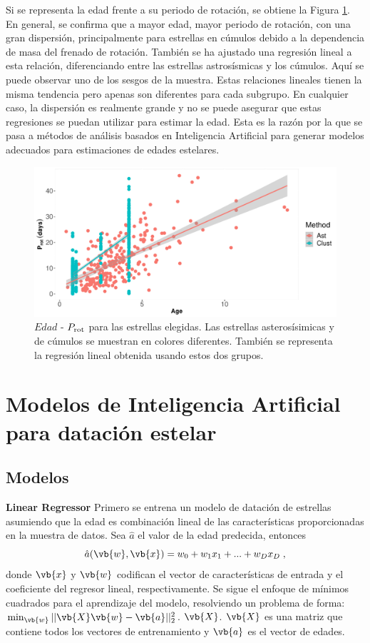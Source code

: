 Si se representa la edad frente a su periodo de rotación, se obtiene la Figura \ref{Fig:Age_rot}. En general, se confirma que a mayor edad, mayor periodo de rotación, con una gran dispersión, principalmente para estrellas en cúmulos debido a la dependencia de masa del frenado de rotación. También se ha ajustado una regresión lineal a esta relación, diferenciando entre las estrellas astrosísmicas y los cúmulos. Aquí se puede observar uno de los sesgos de la muestra. Estas relaciones lineales tienen la misma tendencia pero apenas son diferentes para cada subgrupo. En cualquier caso, la dispersión es realmente grande y no se puede asegurar que estas regresiones se puedan utilizar para estimar la edad. Esta es la razón por la que se pasa a métodos de análisis basados en Inteligencia Artificial para generar modelos adecuados para estimaciones de edades estelares.

\begin{figure}[H]
\begin{center}
 \includegraphics[width=0.8\linewidth]{Figuras/Age_Prot_embedded.pdf}
\end{center}
\caption{$Edad$ - $P_{\rm rot}$ para las estrellas elegidas. Las estrellas asterosísimicas y de cúmulos se muestran en colores diferentes. También se representa la regresión lineal obtenida usando estos dos grupos.}
 \label{Fig:Age_rot}
\end{figure}


\chapter{Modelos de Inteligencia Artificial para datación estelar} 

\section{Modelos}
\label{sec:models}

\textbf{Linear Regressor} {} Primero se entrena un modelo de datación de estrellas asumiendo que la edad es combinación lineal de las características proporcionadas en la muestra de datos. Sea $\hat{a}$ el valor de la edad predecida, entonces
\begin{equation}
\hat{a}(\vb{w}, \vb{x}) = w_0 + w_1 x_1 + ... + w_D x_D \; ,
\end{equation}
donde $\vb{x}$ y $\vb{w}$ codifican el vector de características de entrada y el coeficiente del regresor lineal, respectivamente. Se sigue el enfoque de mínimos cuadrados para el aprendizaje del modelo, resolviendo un problema de forma: $\min_{\vb{w}} || \vb{X} \vb{w} - \vb{a}||_2^2$. $\vb{X}$. $\vb{X}$ es una matriz que contiene todos los vectores de entrenamiento y $\vb{a}$ es el vector de edades. 

